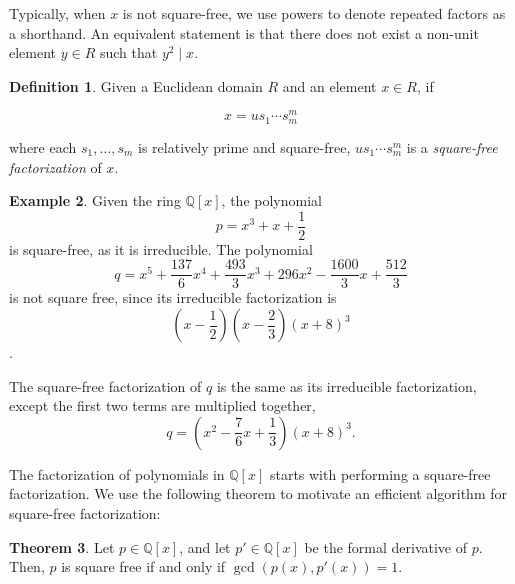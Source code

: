\documentclass{article}
\theoremstyle{definition}
\newtheorem{thm}{Theorem}[section]
\newtheorem{defin}[thm]{Definition}
\newtheorem{exa}[thm]{Example}
\begin{document}
    Typically, when $x$ is not square-free, we use powers to denote repeated factors as a shorthand. An equivalent statement is that there does not exist a non-unit element $y \in R$ such that $y^2\mid x$.
    
    
    \begin{defin}
        Given a Euclidean domain $R$ and an element $x \in R$, if
        
        \begin{equation*}
            x = us_1\cdots s_m^m
        \end{equation*}
        
        where each $s_1, \ldots , s_m$ is relatively prime and square-free, $us_1\cdots s_m^m$ is a \emph{square-free factorization} of $x$. 
    \end{defin}
    
    \begin{exa}
        Given the ring $\mathbb{Q}[x]$, the polynomial \[ p = x^3+x+\frac{1}{2}\] is square-free, as it is irreducible. The polynomial \[ q = {x}^{5}+{\frac {137}{6}}{x}^{4}+{\frac {493}{3}}{x}^{3}+296{x}^{
2}-{\frac {1600}{3}}x+{\frac{512}{3}} \] is not square free, since its irreducible factorization is \[\left( x-\frac{1}{2}\right)\left(x-\frac{2}{3}\right)(x+8)^3 \].

    The square-free factorization of $q$ is the same as its irreducible factorization, except the first two terms are multiplied together, \[q = \left(x^2-\frac{7}{6}x+\frac{1}{3}\right)(x+8)^3.\]
    \end{exa}
    
    The factorization of polynomials in $\mathbb{Q}[x]$ starts with performing a square-free factorization. We use the following theorem to motivate an efficient algorithm for square-free factorization:
    
    \begin{thm} \label{thm1}
        Let $p \in \mathbb{Q}[x]$, and let $p' \in \mathbb{Q}[x]$ be the formal derivative of $p$. Then, $p$ is square free if and only if $\gcd(p(x), p'(x)) = 1$.
    \end{thm}
    
\end{document}
